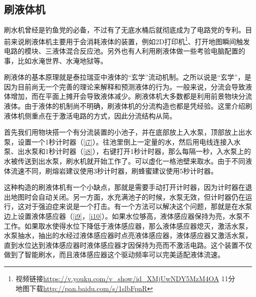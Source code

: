\subsection{刷液体机}

刷水机曾经是钓鱼党的必备，不过有了无底水桶后就彻底成为了电路党的专利。目前来说刷液体机主要用于会消耗液体的装置，例如2D打印机\footnote{视频链接\url{https://v.youku.com/v_show/id_XMjUwNDY5MzM4OA} 11分\\地图下载\url{http://pan.baidu.com/s/1slbFpnR}}、打开地图瞬间触发电路的模块、三液体混合反应池。另外也有人利用刷液体做一些考验电脑配置的事，比如水淹世界、水淹地狱等。

刷液体的基本原理就是泰拉瑞亚中液体的“玄学”流动机制。之所以说是“玄学”，是因为目前尚无一个完善的理论来解释和预测液体的行为。一般来说，分流会导致液体增加，而在平面上摊开会导致液体减少。刷液体机大多数都是利用前景物块分流液体。由于液体的机制尚不明确，刷液体机的分流构造也都是凭经验。这里介绍刷液体机侧重点在于激活电路的方式，因此分流结构从简。

首先我们用物块搭一个有分流装置的小池子，并在底部放上入水泵，顶部放上出水泵，设置一个1秒计时器（\autoref{i7}）。往池里倒上一定量的水，然后用电线连接入水泵、出水泵和1秒计时器（\autoref{i8}），右键打开1秒计时器，那么每隔一秒，入水泵上的水被传送到出水泵，刷水机就开始工作了。可以虚化一格池壁来取水。由于不同液体流速不同，刷熔岩建议使用3秒计时器，刷蜂蜜建议使用5秒计时器。

这种构造的刷液体机有一个小缺点，那就是需要手动打开计时器，因为计时器在退出地图时会自动关闭。另一方面，水充满池子的时候，水泵无效，但计时器仍在运行，这对于强迫症来说是一个打击。有一个方法可以解决这个问题，那就是在水泵边上设置液体感应器（\autoref{i9}，\autoref{i10}）。如果水位够高，液体感应器保持为亮，水泵不工作。如果取水使得水位下降低于液体感应器，那么液体感应器熄灭，激活水泵，水泵抽水，抽出的水经过液体感应器时点亮液体感应器，液体感应器又激活水泵，直到水位达到液体感应器时液体感应器才因保持为亮而不激活电路。这个装置不仅做到了智能刷水，而且液体感应器这个驱动频率可以完美适配液体流速。

